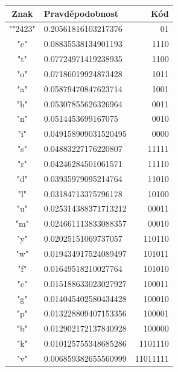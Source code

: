 \documentclass[12pt]{article}
\def\textvisiblespace{{\TVSp\char"2423}}
\begin{document}
\begin{table}[!ht]
\centering
\begin{tabular}{ | c | l | r | } \hline
Znak    &       Pravděpodobnost &       Kód     \\ \hline
"\textvisiblespace "    &       0.20561816103217376     &       01      \\ \hline
"e"     &       0.08835538134901193     &       1110    \\ \hline
"t"     &       0.07724971419238935     &       1100    \\ \hline
"o"     &       0.07186019924873428     &       1011    \\ \hline
"a"     &       0.05879470847623714     &       1001    \\ \hline
"h"     &       0.05307855626326964     &       0011    \\ \hline
"n"     &       0.0514453699167075      &       0010    \\ \hline
"i"     &       0.049158909031520495    &       0000    \\ \hline
"s"     &       0.04883227176220807     &       11111   \\ \hline
"r"     &       0.04246284501061571     &       11110   \\ \hline
"d"     &       0.03935979095214764     &       11010   \\ \hline
"l"     &       0.03184713375796178     &       10100   \\ \hline
"u"     &       0.025314388371713212    &       00011   \\ \hline
"m"     &       0.024661113833088357    &       00010   \\ \hline
"y"     &       0.02025151069737057     &       110110  \\ \hline
"w"     &       0.019434917524089497    &       101011  \\ \hline
"f"     &       0.01649518210027764     &       101010  \\ \hline
"c"     &       0.015188633023027927    &       100011  \\ \hline
"g"     &       0.014045402580434428    &       100010  \\ \hline
"p"     &       0.013228809407153356    &       100001  \\ \hline
"b"     &       0.012902172137840928    &       100000  \\ \hline
"k"     &       0.010125755348685286    &       1101110 \\ \hline
"v"     &       0.006859382655560999    &       11011111        \\ \hline

\end{tabular}
\end{table}
\end{document}
